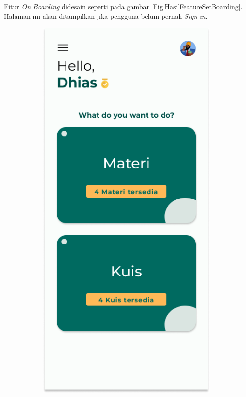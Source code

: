 Fitur \textit{On Boarding} didesain seperti pada gambar \ref*{Fig:HasilFeatureSetBoarding}. Halaman ini akan ditampilkan jika pengguna belum pernah \textit{Sign-in}.
\begin{figure}[H]
	\centering
	\begin{subfigure}[b]{0.23\textwidth}
		\centering
	  \includegraphics[width=\linewidth]{contents/chapter-3/images/HF-Main.png}

\end{subfigure}
\end{figure}
